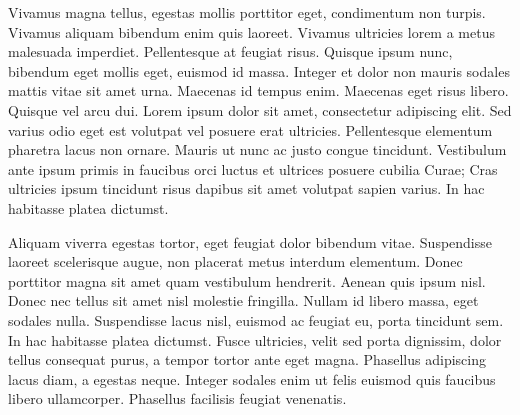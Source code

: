 Vivamus magna tellus, egestas mollis porttitor eget, condimentum non turpis.
Vivamus aliquam bibendum enim quis laoreet. Vivamus ultricies lorem a metus
malesuada imperdiet. Pellentesque at feugiat risus. Quisque ipsum nunc,
bibendum eget mollis eget, euismod id massa. Integer et dolor non mauris
sodales mattis vitae sit amet urna. Maecenas id tempus enim. Maecenas eget
risus libero. Quisque vel arcu dui. Lorem ipsum dolor sit amet, consectetur
adipiscing elit. Sed varius odio eget est volutpat vel posuere erat ultricies.
Pellentesque elementum pharetra lacus non ornare. Mauris ut nunc ac justo
congue tincidunt. Vestibulum ante ipsum primis in faucibus orci luctus et
ultrices posuere cubilia Curae; Cras ultricies ipsum tincidunt risus dapibus
sit amet volutpat sapien varius. In hac habitasse platea dictumst.

Aliquam viverra egestas tortor, eget feugiat dolor bibendum vitae. Suspendisse
laoreet scelerisque augue, non placerat metus interdum elementum. Donec
porttitor magna sit amet quam vestibulum hendrerit. Aenean quis ipsum nisl.
Donec nec tellus sit amet nisl molestie fringilla. Nullam id libero massa,
eget sodales nulla. Suspendisse lacus nisl, euismod ac feugiat eu, porta
tincidunt sem. In hac habitasse platea dictumst. Fusce ultricies, velit sed
porta dignissim, dolor tellus consequat purus, a tempor tortor ante eget
magna. Phasellus adipiscing lacus diam, a egestas neque. Integer sodales enim
ut felis euismod quis faucibus libero ullamcorper. Phasellus facilisis feugiat
venenatis.
